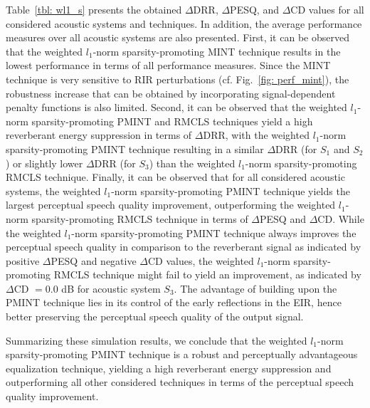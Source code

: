 \documentclass[10pt]{IEEEtran}
\begin{document}
Table~\ref{tbl: wl1_s} presents the obtained $\Delta$DRR, $\Delta$PESQ, and $\Delta$CD values for all considered acoustic systems and techniques.
In addition, the average performance measures over all acoustic systems are also presented.
First, it can be observed that the weighted $l_1$-norm sparsity-promoting MINT technique results in the lowest performance in terms of all performance measures.
Since the MINT technique is very sensitive to RIR perturbations (cf. Fig.~\ref{fig: perf_mint}), the robustness increase that can be obtained by incorporating signal-dependent penalty functions is also limited.
Second, it can be observed that the weighted $l_1$-norm sparsity-promoting PMINT and RMCLS techniques yield a high reverberant energy suppression in terms of $\Delta$DRR, with the weighted $l_1$-norm sparsity-promoting PMINT technique resulting in a similar $\Delta$DRR (for $S_1$ and $S_2$) or slightly lower $\Delta$DRR (for $S_3$) than the weighted $l_1$-norm sparsity-promoting RMCLS technique.
Finally, it can be observed that for all considered acoustic systems, the weighted $l_1$-norm sparsity-promoting PMINT technique yields the largest perceptual speech quality improvement, outperforming the weighted $l_1$-norm sparsity-promoting RMCLS technique in terms of $\Delta$PESQ and $\Delta$CD.
While the weighted $l_1$-norm sparsity-promoting PMINT technique always improves the perceptual speech quality in comparison to the reverberant signal as indicated by positive $\Delta$PESQ and negative $\Delta$CD values, the weighted $l_1$-norm sparsity-promoting RMCLS technique might fail to yield an improvement, as indicated by $\Delta$CD $= 0.0$ dB for acoustic system $S_3$.
The advantage of building upon the PMINT technique lies in its control of the early reflections in the EIR, hence better preserving the perceptual speech quality of the output signal. 

Summarizing these simulation results, we conclude that the weighted $l_1$-norm sparsity-promoting PMINT technique is a robust and perceptually advantageous equalization technique, yielding a high reverberant energy suppression and outperforming all other considered techniques in terms of the perceptual speech quality improvement.
\end{document}
